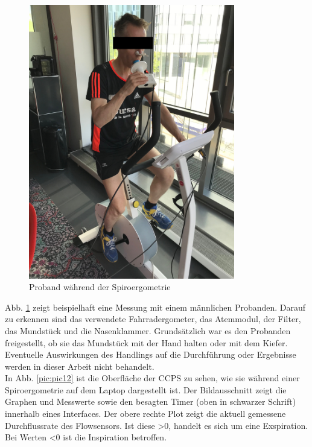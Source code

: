 \begin{figure}[H]
	\centering
	\includegraphics[width=90mm]{Bilder/proband.jpg}
	\caption{Proband während der Spiroergometrie}
	\label{pic:pic11}
\end{figure}

Abb. \ref{pic:pic11} zeigt beispielhaft eine Messung mit einem männlichen Probanden. Darauf zu erkennen sind das verwendete Fahrradergometer, das Atemmodul, der Filter, das Mundstück und die Nasenklammer. Grundsätzlich war es den Probanden freigestellt, ob sie das Mundstück mit der Hand halten oder mit dem Kiefer. Eventuelle Auswirkungen des Handlings auf die Durchführung oder Ergebnisse werden in dieser Arbeit nicht behandelt.\\
In Abb. \ref{pic:pic12} ist die Oberfläche der \acs{CCPS} zu sehen, wie sie während einer Spiroergometrie auf dem Laptop dargestellt ist. Der Bildausschnitt zeigt die Graphen und Messwerte sowie den besagten Timer (oben in schwarzer Schrift) innerhalb eines Interfaces. Der obere rechte Plot zeigt die aktuell gemessene Durchflussrate des Flowsensors. Ist diese >0, handelt es sich um eine Exspiration. Bei Werten <0 ist die Inspiration betroffen.

